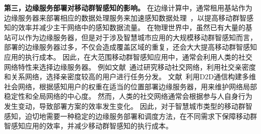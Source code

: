 


\textbf{第三，边缘服务部署对移动群智感知的影响。}
在边缘计算中，通常租用基站作为边缘服务器来部署相应的数据处理服务来加速感知数据处理~\cite{DBLP:journals/fgcs/TarnebergMWTEKE17,DBLP:journals/ton/ChenJLF16,DBLP:conf/IEEEcloud/HabakAHZ15}，以提高移动群智感知的效率并减少主干网络中的感知数据流量。
在物理世界中，虽然已有大量的基站可以作为边缘服务器，但是对于涉及智慧城市应用的大规模移动群智感知而言，部署的边缘服务器过多，不仅会造成覆盖区域的重复，还会大大提高移动群智感知应用的执行成本。
因此，在大范围移动群智感知应用中，通常会利用人类的社交网络特性来选择边缘服务器。
例如文献~通过研究移动社交网络，利用社交亲密度和关系网络，选择亲密度较高的用户进行任务分发。
文献~利用D2D通信构建多维社会网络，根据感知用户的权重在适当的位置部署边缘服务器，用来维护网络局部稳定性和全局网络的中心度。
然而，人类的社交网络通常会根据参与人自身行为发生变动，导致部署方案的效率发生变化。
因此，对于智慧城市类型的移动群智感知，迫切地需要一种稳定的边缘服务部署和调度方法，在不同需求下保障移动群智感知应用的效率，并减少移动群智感知的执行成本。

